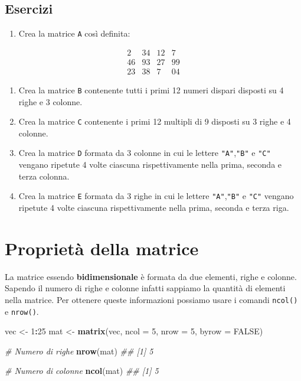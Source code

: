 \documentclass[
]{book}
\newenvironment{Shaded}{\begin{snugshade}}{\end{snugshade}}
\newcommand{\CommentTok}[1]{\textcolor[rgb]{0.56,0.35,0.01}{\textit{#1}}}
\newcommand{\DataTypeTok}[1]{\textcolor[rgb]{0.13,0.29,0.53}{#1}}
\newcommand{\DecValTok}[1]{\textcolor[rgb]{0.00,0.00,0.81}{#1}}
\newcommand{\KeywordTok}[1]{\textcolor[rgb]{0.13,0.29,0.53}{\textbf{#1}}}
\newcommand{\NormalTok}[1]{#1}
\newcommand{\OperatorTok}[1]{\textcolor[rgb]{0.81,0.36,0.00}{\textbf{#1}}}
\newcommand{\OtherTok}[1]{\textcolor[rgb]{0.56,0.35,0.01}{#1}}
\newcommand{\StringTok}[1]{\textcolor[rgb]{0.31,0.60,0.02}{#1}}
\providecommand{\tightlist}{%
  \setlength{\itemsep}{0pt}\setlength{\parskip}{0pt}}
\begin{document}
\hypertarget{esercizi-6}{%
\subsection*{Esercizi}\label{esercizi-6}}

\begin{enumerate}
\def\labelenumi{\arabic{enumi}.}
\tightlist
\item
  Crea la matrice \texttt{A} così definita:
\end{enumerate}

\[
\begin{matrix}
2 & 34 & 12 & 7\\
46 & 93 & 27 & 99\\
23  & 38 & 7 & 04
\end{matrix}
\]

\begin{enumerate}
\def\labelenumi{\arabic{enumi}.}
\setcounter{enumi}{1}
\tightlist
\item
  Crea la matrice \texttt{B} contenente tutti i primi 12 numeri dispari disposti su 4 righe e 3 colonne.
\item
  Crea la matrice \texttt{C} contenente i primi 12 multipli di 9 disposti su 3 righe e 4 colonne.
\item
  Crea la matrice \texttt{D} formata da 3 colonne in cui le lettere \texttt{"A"},\texttt{"B"} e \texttt{"C"} vengano ripetute 4 volte ciascuna rispettivamente nella prima, seconda e terza colonna.
\item
  Crea la matrice \texttt{E} formata da 3 righe in cui le lettere \texttt{"A"},\texttt{"B"} e \texttt{"C"} vengano ripetute 4 volte ciascuna rispettivamente nella prima, seconda e terza riga.
\end{enumerate}

\hypertarget{mat-prop}{%
\section{Proprietà della matrice}\label{mat-prop}}

La matrice essendo \textbf{bidimensionale} è formata da due elementi, righe e colonne. Sapendo il numero di righe e colonne infatti sappiamo la quantità di elementi nella matrice. Per ottenere queste informazioni possiamo usare i comandi \texttt{ncol()} e \texttt{nrow()}.

\begin{Shaded}
\begin{Highlighting}[]
\NormalTok{vec <-}\StringTok{ }\DecValTok{1}\OperatorTok{:}\DecValTok{25}
\NormalTok{mat <-}\StringTok{ }\KeywordTok{matrix}\NormalTok{(vec, }\DataTypeTok{ncol =} \DecValTok{5}\NormalTok{, }\DataTypeTok{nrow =} \DecValTok{5}\NormalTok{, }\DataTypeTok{byrow =} \OtherTok{FALSE}\NormalTok{)}

\CommentTok{# Numero di righe}
\KeywordTok{nrow}\NormalTok{(mat)}
\CommentTok{## [1] 5}

\CommentTok{# Numero di colonne}
\KeywordTok{ncol}\NormalTok{(mat)}
\CommentTok{## [1] 5}
\end{Highlighting}
\end{Shaded}
\end{document}
